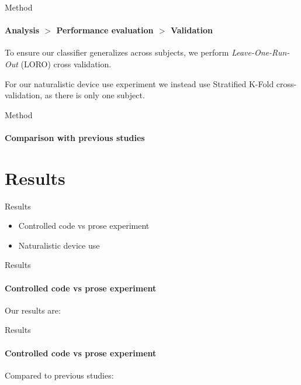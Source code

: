 \documentclass[xcolor={dvipsnames,table},12pt]{beamer}
\newif\ifplacelogo{}  %
\begin{document}
\begin{frame}{Method}
    \framesubtitle{Analysis $>$ Performance evaluation $>$ Validation}
    To ensure our classifier generalizes across subjects, we perform \emph{Leave-One-Run-Out} (LORO) cross validation.

    \begin{adjustbox}{width=0.6\textwidth, center, float=table}
        
    \end{adjustbox}

    For our naturalistic device use experiment we instead use Stratified K-Fold cross-validation, as there is only one subject.
\end{frame}

\placelogofalse{}
\begin{frame}{Method}
    \framesubtitle{Comparison with previous studies}
    \vspace*{-10mm}
    \begin{adjustbox}{width=\textwidth,center,float=table}
        
    \end{adjustbox}
\end{frame}
\placelogotrue{}

\section{Results}
\begin{frame}{Results}
    \begin{itemize}
        \item Controlled code vs prose experiment
        \item Naturalistic device use
    \end{itemize}
\end{frame}

\begin{frame}{Results}
    \framesubtitle{Controlled code vs prose experiment}
    Our results are:
    {\scriptsize
     
    }
\end{frame}

\begin{frame}{Results}
    \framesubtitle{Controlled code vs prose experiment}
    Compared to previous studies:
    {
        \scriptsize
        
    }
\end{frame}
\end{document}
